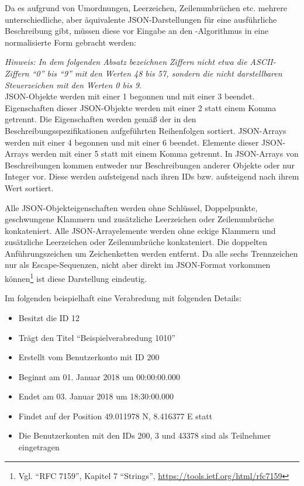 \documentclass[parskip=full,11pt]{scrartcl}
\begin{document}
\par Da es aufgrund von Umordnungen, Leerzeichen, Zeilenumbrüchen etc. mehrere
unterschiedliche, aber äquivalente JSON-Darstellungen für eine ausführliche
Beschreibung gibt, müssen diese vor Eingabe an den \hashAlg-Algorithmus in eine
normalisierte Form gebracht werden:

\par \textit{Hinweis: In dem folgenden Absatz bezeichnen Ziffern nicht etwa die
ASCII-Ziffern \enquote{0} bis \enquote{9} mit den Werten 48 bis 57, sondern die
nicht darstellbaren Steuerzeichen mit den Werten 0 bis 9.}\\
JSON-Objekte werden mit einer 1 begonnen und mit einer 3 beendet.
Eigenschaften dieser JSON-Objekte werden mit einer 2 statt einem Komma
getrennt.
Die Eigenschaften werden gemäß der in den Beschreibungsspezifikationen
aufgeführten Reihenfolgen sortiert.
JSON-Arrays werden mit einer 4 begonnen und mit einer 6 beendet.
Elemente dieser JSON-Arrays werden mit einer 5 statt mit einem Komma getrennt.
In JSON-Arrays von Beschreibungen kommen entweder nur Beschreibungen anderer
Objekte oder nur Integer vor.
Diese werden aufsteigend nach ihren IDs bzw. aufsteigend nach ihrem Wert
sortiert.

Alle JSON-Objekteigenschaften werden ohne Schlüssel, Doppelpunkte, geschwungene
Klammern und zusätzliche Leerzeichen oder Zeilenumbrüche konkateniert.
Alle JSON-Arrayelemente werden ohne eckige Klammern und zusätzliche
Leerzeichen oder Zeilenumbrüche konkateniert.
Die doppelten Anführungszeichen um Zeichenketten werden entfernt.
Da alle sechs Trennzeichen nur als Escape-Sequenzen, nicht aber direkt im
JSON-Format vorkommen können\footnote{Vgl. \enquote{RFC 7159}, Kapitel 7
\enquote{Strings}, \url{https://tools.ietf.org/html/rfc7159}} ist diese
Darstellung eindeutig.

\par Im folgenden beispielhaft eine Verabredung mit folgenden Details:
\begin{itemize}
    \item Besitzt die ID 12
    \item Trägt den Titel \enquote{Beispielverabredung 1010}
    \item Erstellt vom Benutzerkonto mit ID 200
    \item Beginnt am 01. Januar 2018 um 00:00:00.000
    \item Endet am 03. Januar 2018 um 18:30:00.000
    \item Findet auf der Position 49.011978 N, 8.416377 E statt
    \item Die Benutzerkonten mit den IDs 200, 3 und 43378 sind als Teilnehmer
        eingetragen
\end{itemize}
\end{document}
